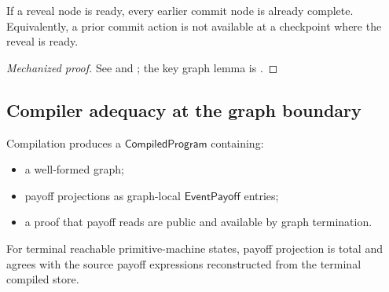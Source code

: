 \begin{theorem}
\label{thm:barrier}
If a reveal node is ready, every earlier commit node is already complete.
Equivalently, a prior commit action is not available at a checkpoint where
the reveal is ready.
\end{theorem}

\begin{proof}[Mechanized proof]
See  and ;
the key graph lemma is .
\end{proof}

\subsection{Compiler adequacy at the graph boundary}
\label{sec:eg:adequacy}

Compilation produces a \(\mathsf{CompiledProgram}\) containing:
\begin{itemize}\itemsep1pt
\item a well-formed graph;
\item payoff projections as graph-local \(\mathsf{EventPayoff}\)
  entries;
\item a proof that payoff reads are public and available by graph
  termination.
\end{itemize}
For terminal reachable primitive-machine states, payoff projection is
total and agrees with the source payoff expressions reconstructed from
the terminal compiled store.

